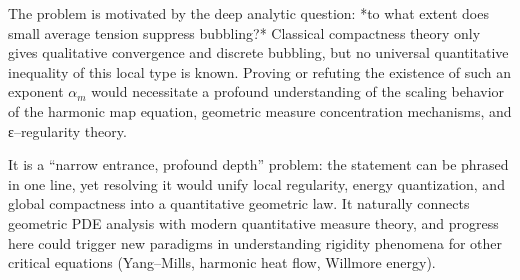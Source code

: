 The problem is motivated by the deep analytic question: *to what extent does small average tension suppress bubbling?* Classical compactness theory only gives qualitative convergence and discrete bubbling, but no universal quantitative inequality of this local type is known. Proving or refuting the existence of such an exponent \( \alpha_m \) would necessitate a profound understanding of the scaling behavior of the harmonic map equation, geometric measure concentration mechanisms, and ε–regularity theory.

It is a “narrow entrance, profound depth” problem: the statement can be phrased in one line, yet resolving it would unify local regularity, energy quantization, and global compactness into a quantitative geometric law. It naturally connects geometric PDE analysis with modern quantitative measure theory, and progress here could trigger new paradigms in understanding rigidity phenomena for other critical equations (Yang–Mills, harmonic heat flow, Willmore energy).